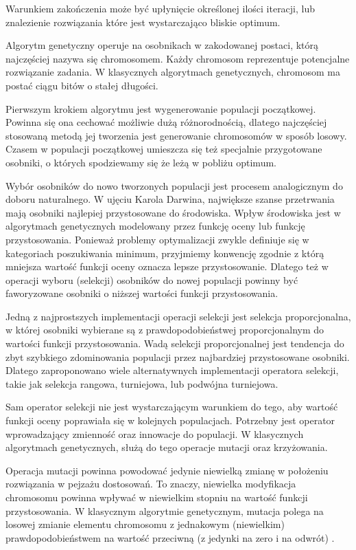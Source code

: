 \documentclass[brudnopis]{xmgr}
\begin{document}
Warunkiem zakończenia może być upłynięcie określonej ilości iteracji, lub znalezienie rozwiązania które jest wystarczająco bliskie optimum.

Algorytm genetyczny operuje na osobnikach w zakodowanej postaci, którą najczęściej nazywa się chromosomem. Każdy chromosom reprezentuje potencjalne rozwiązanie zadania. W klasycznych algorytmach genetycznych, chromosom ma postać ciągu bitów o stałej długości.

Pierwszym krokiem algorytmu jest wygenerowanie populacji początkowej. Powinna się ona cechować możliwie dużą różnorodnością, dlatego najczęściej stosowaną metodą jej tworzenia jest generowanie chromosomów w sposób losowy. Czasem w populacji początkowej umieszcza się też specjalnie przygotowane osobniki, o których spodziewamy się że leżą w pobliżu optimum.

Wybór osobników do nowo tworzonych populacji jest procesem analogicznym do doboru naturalnego. W ujęciu Karola Darwina, największe szanse przetrwania mają osobniki najlepiej przystosowane do środowiska. Wpływ środowiska jest w algorytmach genetycznych modelowany przez funkcję oceny lub funkcję przystosowania. Ponieważ problemy optymalizacji zwykle definiuje się w kategoriach poszukiwania minimum, przyjmiemy konwencję zgodnie z którą mniejsza wartość funkcji oceny oznacza lepsze przystosowanie. Dlatego też w operacji wyboru (selekcji) osobników do nowej populacji powinny być faworyzowane osobniki o niższej wartości funkcji przystosowania.

Jedną z najprostszych implementacji operacji selekcji jest selekcja proporcjonalna, w której osobniki wybierane są z prawdopodobieństwej proporcjonalnym do wartości funkcji przystosowania. Wadą selekcji proporcjonalnej jest tendencja do zbyt szybkiego zdominowania populacji przez najbardziej przystosowane osobniki. Dlatego zaproponowano wiele alternatywnych implementacji operatora selekcji, takie jak selekcja rangowa, turniejowa, lub podwójna turniejowa.

Sam operator selekcji nie jest wystarczającym warunkiem do tego, aby wartość funkcji oceny poprawiała się w kolejnych populacjach. Potrzebny jest operator wprowadzający zmienność oraz innowacje do populacji. W klasycznych algorytmach genetycznych, służą do tego operacje mutacji oraz krzyżowania.

Operacja mutacji powinna powodować jedynie niewielką zmianę w położeniu rozwiązania w pejzażu dostosowań. To znaczy, niewielka modyfikacja chromosomu powinna wpływać w niewielkim stopniu na wartość funkcji przystosowania. W klasycznym algorytmie genetycznym, mutacja polega na losowej zmianie elementu chromosomu z jednakowym (niewielkim) prawdopodobieństwem na wartość przeciwną (z jedynki na zero i na odwrót) \cite{Goldberg:1998:AGZ}.
\end{document}
